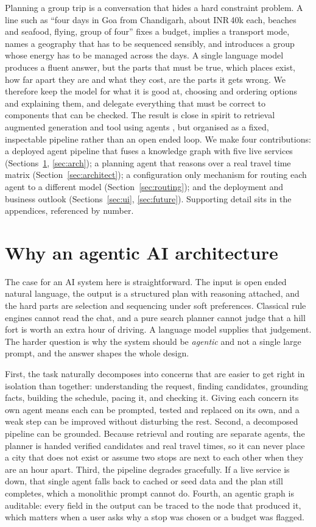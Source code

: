 \documentclass{ecai}
\newcommand{\rupee}{INR\,}
\begin{document}
Planning a group trip is a conversation that hides a hard constraint problem.
A line such as ``four days in Goa from Chandigarh, about \rupee40k each,
beaches and seafood, flying, group of four'' fixes a budget, implies a
transport mode, names a geography that has to be sequenced sensibly, and
introduces a group whose energy has to be managed across the days. A single
language model produces a fluent answer, but the parts that must be true, which
places exist, how far apart they are and what they cost, are the parts it gets
wrong. We therefore keep the model for what it is good at, choosing and
ordering options and explaining them, and delegate everything that must be
correct to components that can be checked. The result is close in spirit to
retrieval augmented generation \citep{lewis2020rag} and tool using agents
\citep{yao2023react,schick2023toolformer}, but organised as a fixed,
inspectable pipeline rather than an open ended loop. We make four
contributions: a deployed agent pipeline that fuses a knowledge graph with five
live services (Sections~\ref{sec:why}, \ref{sec:arch}); a planning agent that
reasons over a real travel time matrix (Section~\ref{sec:architect}); a
configuration only mechanism for routing each agent to a different model
(Section~\ref{sec:routing}); and the deployment and business outlook
(Sections~\ref{sec:ui}, \ref{sec:future}). Supporting detail sits in the
appendices, referenced by number.

\section{Why an agentic AI architecture}
\label{sec:why}

The case for an AI system here is straightforward. The input is open ended
natural language, the output is a structured plan with reasoning attached, and
the hard parts are selection and sequencing under soft preferences. Classical
rule engines cannot read the chat, and a pure search planner cannot judge that
a hill fort is worth an extra hour of driving. A language model supplies that
judgement. The harder question is why the system should be \emph{agentic} and
not a single large prompt, and the answer shapes the whole design.

First, the task naturally decomposes into concerns that are easier to get right
in isolation than together: understanding the request, finding candidates,
grounding facts, building the schedule, pacing it, and checking it. Giving each
concern its own agent means each can be prompted, tested and replaced on its
own, and a weak step can be improved without disturbing the rest. Second, a
decomposed pipeline can be grounded. Because retrieval and routing are separate
agents, the planner is handed verified candidates and real travel times, so it
can never place a city that does not exist or assume two stops are next to each
other when they are an hour apart. Third, the pipeline degrades gracefully. If
a live service is down, that single agent falls back to cached or seed data and
the plan still completes, which a monolithic prompt cannot do. Fourth, an
agentic graph is auditable: every field in the output can be traced to the node
that produced it, which matters when a user asks why a stop was chosen or a
budget was flagged.
\end{document}
